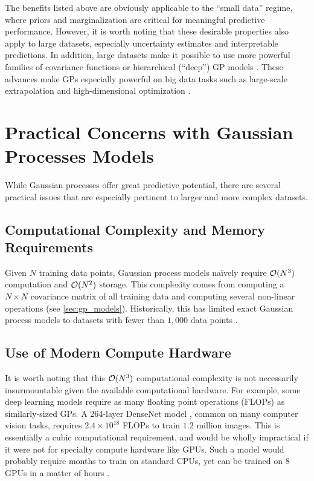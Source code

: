 The benefits listed above are obviously applicable to the ``small data'' regime, where priors and marginalization are critical for meaningful predictive performance.
However, it is worth noting that these desirable properties also apply to large datasets, especially uncertainty estimates and interpretable predictions.
In addition, large datasets make it possible to use more powerful families of covariance functions \citep{wilson2013gaussian,wilson2016deep,benton2019function} or hierarchical (``deep'') GP models \cite{wilson2016deep,salimbeni2017doubly,jankowiak2020deep}.
These advances make GPs especially powerful on big data tasks such as large-scale extrapolation \citep{jankowiak2020parametric} and high-dimensional optimization \citep{eriksson2019scalable}.


\section{Practical Concerns with Gaussian Processes Models}

While Gaussian processes offer great predictive potential, there are several practical issues that are especially pertinent to larger and more complex datasets.

\subsection{Computational Complexity and Memory Requirements}
Given $N$ training data points, Gaussian process models na\"{i}vely require $\bigo{N^3}$ computation and $\bigo{N^2}$ storage.
This complexity comes from computing a $N \times N$ covariance matrix of all training data and computing several non-linear operations (see \cref{sec:gp_models}).
Historically, this has limited exact Gaussian process models to datasets with fewer than $1,\!000$ data points \cite{hensman2013gaussian}.

\subsection{Use of Modern Compute Hardware}
It is worth noting that this $\bigo{N^3}$ computational complexity is not necessarily insurmountable given the available computational hardware.
For example, some deep learning models require as many floating point operations (FLOPs) as similarly-sized GPs.
A 264-layer DenseNet model \cite{huang2017densely}, common on many computer vision tasks, requires $2.4 \times 10^{18}$ FLOPs to train $1.2$ million images.
This is essentially a cubic computational requirement, and would be wholly impractical if it were not for specialty compute hardware like GPUs.
Such a model would probably require months to train on standard CPUs, yet can be trained on 8 GPUs in a matter of hours \cite{howard2018training}.

